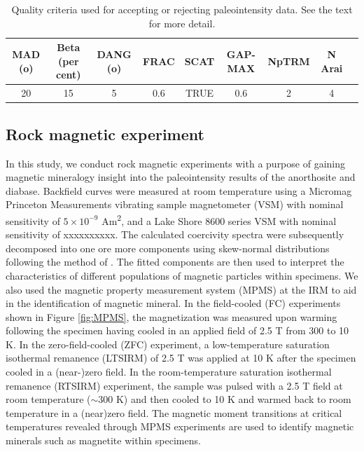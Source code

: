 \documentclass[draft]{agujournal2019}
\begin{document}
\begin{table}
\caption{Quality criteria used for accepting or rejecting paleointensity data. See the text for more detail.} 
\centering
\begin{tabular}{ccccccccc}
\hline
MAD (o) & Beta (per cent) & DANG (o) & FRAC& SCAT & GAP-MAX & NpTRM & N Arai\\
\hline
20 & 15 & 5 & 0.6 & TRUE & 0.6 & 2 & 4 \\
\hline

\end{tabular}
\label{tab:criteria}
\end{table}



\subsection*{Rock magnetic experiment}

In this study, we conduct rock magnetic experiments with a purpose of gaining magnetic mineralogy insight into the paleointensity results of the anorthosite and diabase. Backfield curves were measured at room temperature using a Micromag Princeton Measurements vibrating sample magnetometer (VSM) with nominal sensitivity of $5 \times 10^{-9}$ Am\textsuperscript{2}, and a Lake Shore 8600 series VSM with nominal sensitivity of xxxxxxxxxx. The calculated coercivity spectra were subsequently decomposed into one ore more components using skew-normal distributions following the method of . The fitted components are then used to interpret the characteristics of different populations of magnetic particles within specimens. We also used the magnetic property measurement system (MPMS) at the IRM to aid in the identification of magnetic mineral. In the field-cooled (FC) experiments shown in Figure \ref{fig:MPMS}, the magnetization was measured upon warming following the specimen having cooled in an applied field of 2.5 T from 300 to 10 K. In the zero-field-cooled (ZFC) experiment, a low-temperature saturation isothermal remanence (LTSIRM) of 2.5 T was applied at 10 K after the specimen cooled in a (near-)zero field. In the room-temperature saturation isothermal remanence (RTSIRM) experiment, the sample was pulsed with a 2.5 T field at room temperature ($\sim$300 K) and then cooled to 10 K and warmed back to room temperature in a (near)zero field. The magnetic moment transitions at critical temperatures revealed through MPMS experiments are used to identify magnetic minerals such as magnetite \cite{Verwey1939a} within specimens. 
\end{document}
